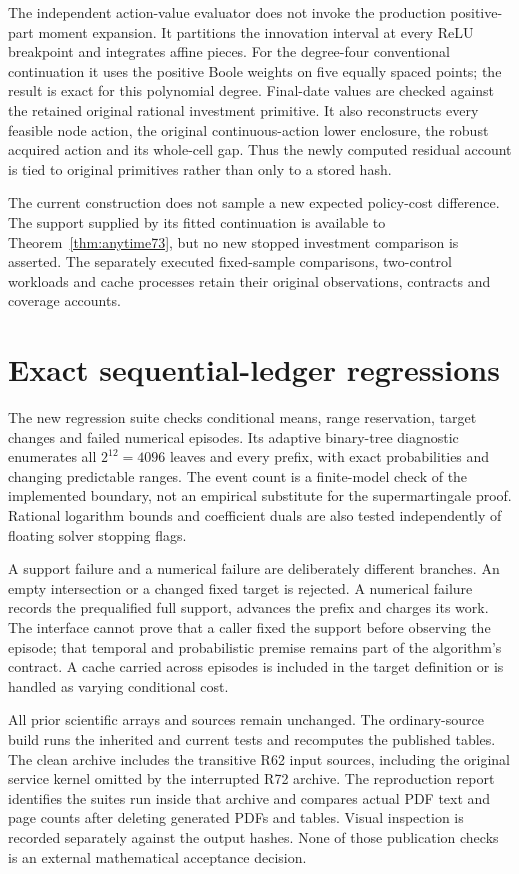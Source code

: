 The independent action-value evaluator does not invoke the production positive-part moment expansion. It partitions the innovation interval at every ReLU breakpoint and integrates affine pieces. For the degree-four conventional continuation it uses the positive Boole weights on five equally spaced points; the result is exact for this polynomial degree. Final-date values are checked against the retained original rational investment primitive. It also reconstructs every feasible node action, the original continuous-action lower enclosure, the robust acquired action and its whole-cell gap. Thus the newly computed residual account is tied to original primitives rather than only to a stored hash.

The current construction does not sample a new expected policy-cost difference. The support supplied by its fitted continuation is available to Theorem~\ref{thm:anytime73}, but no new stopped investment comparison is asserted. The separately executed fixed-sample comparisons, two-control workloads and cache processes retain their original observations, contracts and coverage accounts.

\section{Exact sequential-ledger regressions}\label{supp:ledger73}
The new regression suite checks conditional means, range reservation, target changes and failed numerical episodes. Its adaptive binary-tree diagnostic enumerates all $2^{12}=4096$ leaves and every prefix, with exact probabilities and changing predictable ranges. The event count is a finite-model check of the implemented boundary, not an empirical substitute for the supermartingale proof. Rational logarithm bounds and coefficient duals are also tested independently of floating solver stopping flags.

A support failure and a numerical failure are deliberately different branches. An empty intersection or a changed fixed target is rejected. A numerical failure records the prequalified full support, advances the prefix and charges its work. The interface cannot prove that a caller fixed the support before observing the episode; that temporal and probabilistic premise remains part of the algorithm's contract. A cache carried across episodes is included in the target definition or is handled as varying conditional cost.

All prior scientific arrays and sources remain unchanged. The ordinary-source build runs the inherited and current tests and recomputes the published tables. The clean archive includes the transitive R62 input sources, including the original service kernel omitted by the interrupted R72 archive. The reproduction report identifies the suites run inside that archive and compares actual PDF text and page counts after deleting generated PDFs and tables. Visual inspection is recorded separately against the output hashes. None of those publication checks is an external mathematical acceptance decision.
